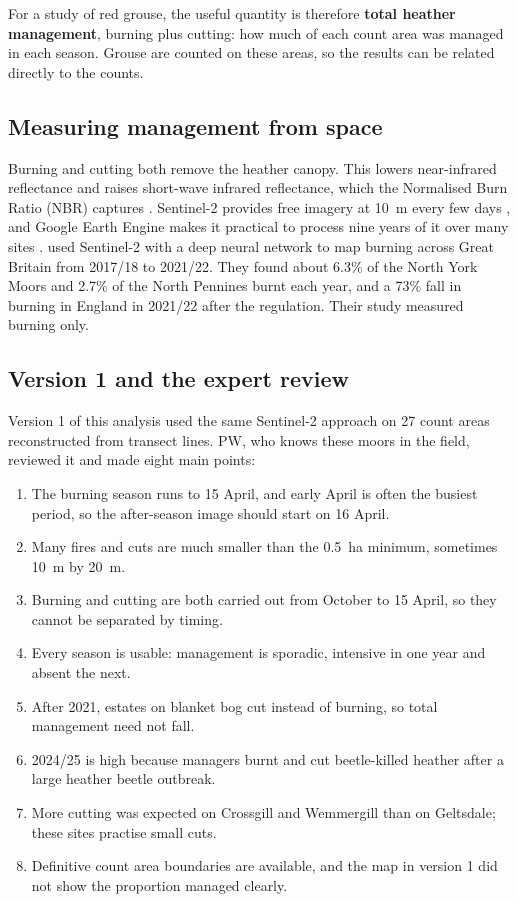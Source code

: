 \documentclass[11pt,a4paper]{article}
\begin{document}
For a study of red grouse, the useful quantity is therefore \textbf{total heather management}, burning plus cutting: how much of each count area was managed in each season. Grouse are counted on these areas, so the results can be related directly to the counts.

\subsection{Measuring management from space}

Burning and cutting both remove the heather canopy. This lowers near-infrared reflectance and raises short-wave infrared reflectance, which the Normalised Burn Ratio (NBR) captures \citep{key2006}. Sentinel-2 provides free imagery at 10~m every few days \citep{drusch2012}, and Google Earth Engine makes it practical to process nine years of it over many sites \citep{gorelick2017}. \citet{shewring2024} used Sentinel-2 with a deep neural network to map burning across Great Britain from 2017/18 to 2021/22. They found about 6.3\% of the North York Moors and 2.7\% of the North Pennines burnt each year, and a 73\% fall in burning in England in 2021/22 after the regulation. Their study measured burning only.

\subsection{Version 1 and the expert review}

Version 1 of this analysis used the same Sentinel-2 approach on 27 count areas reconstructed from transect lines. PW, who knows these moors in the field, reviewed it and made eight main points:

\begin{enumerate}
\item The burning season runs to 15 April, and early April is often the busiest period, so the after-season image should start on 16 April.
\item Many fires and cuts are much smaller than the 0.5~ha minimum, sometimes 10~m by 20~m.
\item Burning and cutting are both carried out from October to 15 April, so they cannot be separated by timing.
\item Every season is usable: management is sporadic, intensive in one year and absent the next.
\item After 2021, estates on blanket bog cut instead of burning, so total management need not fall.
\item 2024/25 is high because managers burnt and cut beetle-killed heather after a large heather beetle outbreak.
\item More cutting was expected on Crossgill and Wemmergill than on Geltsdale; these sites practise small cuts.
\item Definitive count area boundaries are available, and the map in version 1 did not show the proportion managed clearly.
\end{enumerate}
\end{document}

